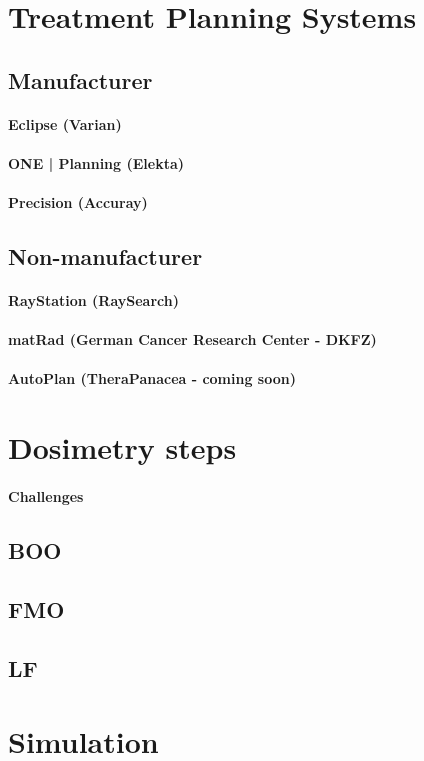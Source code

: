 \section{Treatment Planning Systems}
\subsection{Manufacturer}
\paragraph{Eclipse (Varian)}
\paragraph{ONE | Planning (Elekta)}
\paragraph{Precision (Accuray)}
\subsection{Non-manufacturer}
\paragraph{RayStation (RaySearch)}
\paragraph{matRad (German Cancer Research Center - DKFZ)}
\paragraph{AutoPlan (TheraPanacea - coming soon)}

\section{Dosimetry steps}
\paragraph{Challenges}
\subsection{BOO}
\subsection{FMO}
\subsection{LF}

\section{Simulation}
